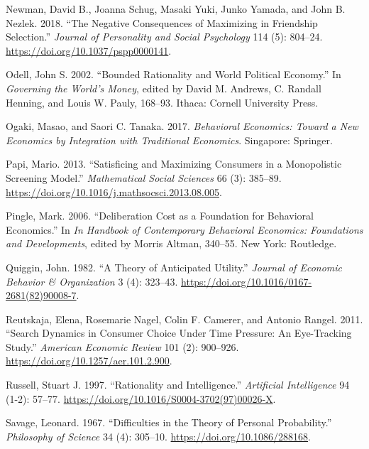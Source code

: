\documentclass[
  12pt,
]{article}
\newlength{\cslhangindent}
\newlength{\cslentryspacingunit} %
\newenvironment{CSLReferences}[2] %
 {%
  \setlength{\parindent}{0pt}
  \ifodd #1
  \let\oldpar\par
  \def\par{\hangindent=\cslhangindent\oldpar}
  \fi
  \setlength{\parskip}{#2\cslentryspacingunit}
 }%
 {}
\begin{document}
\begin{CSLReferences}{1}{0}
\leavevmode{}%
Newman, David B., Joanna Schug, Masaki Yuki, Junko Yamada, and John B. Nezlek. 2018. {``The Negative Consequences of Maximizing in Friendship Selection.''} \emph{Journal of Personality and Social Psychology} 114 (5): 804--24. \url{https://doi.org/10.1037/pspp0000141}.

\leavevmode{}%
Odell, John S. 2002. {``Bounded Rationality and World Political Economy.''} In \emph{Governing the World's Money}, edited by David M. Andrews, C. Randall Henning, and Louis W. Pauly, 168--93. Ithaca: Cornell University Press.

\leavevmode{}%
Ogaki, Masao, and Saori C. Tanaka. 2017. \emph{Behavioral Economics: Toward a New Economics by Integration with Traditional Economics}. Singapore: Springer.

\leavevmode{}%
Papi, Mario. 2013. {``Satisficing and Maximizing Consumers in a Monopolistic Screening Model.''} \emph{Mathematical Social Sciences} 66 (3): 385--89. \url{https://doi.org/10.1016/j.mathsocsci.2013.08.005}.

\leavevmode{}%
Pingle, Mark. 2006. {``Deliberation Cost as a Foundation for Behavioral Economics.''} In \emph{In Handbook of Contemporary Behavioral Economics: Foundations and Developments}, edited by Morris Altman, 340--55. New York: Routledge.

\leavevmode{}%
Quiggin, John. 1982. {``A Theory of Anticipated Utility.''} \emph{Journal of Economic Behavior \& Organization} 3 (4): 323--43. \url{https://doi.org/10.1016/0167-2681(82)90008-7}.

\leavevmode{}%
Reutskaja, Elena, Rosemarie Nagel, Colin F. Camerer, and Antonio Rangel. 2011. {``Search Dynamics in Consumer Choice Under Time Pressure: An Eye-Tracking Study.''} \emph{American Economic Review} 101 (2): 900--926. \url{https://doi.org/10.1257/aer.101.2.900}.

\leavevmode{}%
Russell, Stuart J. 1997. {``Rationality and Intelligence.''} \emph{Artificial Intelligence} 94 (1-2): 57--77. \url{https://doi.org/10.1016/S0004-3702(97)00026-X}.

\leavevmode{}%
Savage, Leonard. 1967. {``Difficulties in the Theory of Personal Probability.''} \emph{Philosophy of Science} 34 (4): 305--10. \url{https://doi.org/10.1086/288168}.


\end{CSLReferences}
\end{document}
